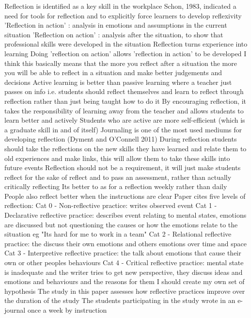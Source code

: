 \documentclass{l4proj}
\begin{document}
Reflection is identified as a key skill in the workplace
Schon, 1983, indicated a need for tools for reflection and to explicitly force learners to develop reflexivity
'Reflection in action' : analysis in emotions and assumptions in the current situation
'Reflection on action' : analysis after the situation, to show that professional skills were developed in the situation
Reflection turns experience into learning
Doing 'reflection on action' allows 'reflection in action' to be developed
I think this basically means that the more you reflect after a situation the more you will be able to reflect in a situation and make better judgements and decisions
Active learning is better than passive learning where a teacher just passes on info i.e. students should reflect themselves and learn to reflect through reflection rather than just being taught how to do it
By encouraging reflection, it takes the responsibility of learning away from the teacher and allows students to learn better and actively
Students who are active are more self-efficient (which is a graduate skill in and of itself)
Journaling is one of the most used mediums for developing reflection (Dyment and O'Connell 2011)
During reflection students should take the reflections on the new skills they have learned and relate them to old experiences and make links, this will allow them to take these skills into future events
Reflection should not be a requirement, it will just make students reflect for the sake of reflect and to pass an assessment, rather than actually critically reflecting
Its better to as for a reflection weekly rather than daily
People also reflect better when the instructions are clear
Paper cites five levels of reflection:
Cat 0 - Non-reflective practice: writes observed event
Cat 1 - Declarative reflective practice: describes event relating to mental states, emotions are discussed but not questioning the causes or how the emotions relate to the situation eg "Its hard for me to work in a team"
Cat 2 - Relational reflective practice: the discuss their own emotions and others emotions over time and space
Cat 3 - Interpretive reflective practice: the talk about emotions that cause their own or other peoples behaviours
Cat 4 - Critical reflective practice: mental state is inadequate and the writer tries to get new perspective, they discuss ideas and emotions and behaviours and the reasons for them
I should create my own set of hypothesis
The study in this paper assesses how reflective practices improve over the duration of the study
The students participating in the study wrote in an e-journal once a week by instruction
\end{document}
